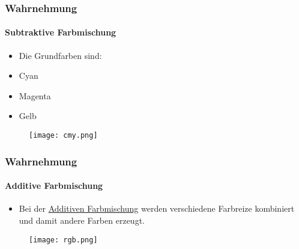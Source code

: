 \begin{frame}
    \frametitle{Wahrnehmung}
    \framesubtitle{Subtraktive Farbmischung}
    \begin{minipage}{0.5\textwidth}
        \begin{itemize}
            \item Die Grundfarben sind:
            \item Cyan
            \item Magenta
            \item Gelb
        \end{itemize}
    \end{minipage} \hfill
    \begin{minipage}{0.45\textwidth}
        \begin{figure}
            \texttt{[image: cmy.png]}
        \end{figure}
    \end{minipage}
\end{frame}

\begin{frame}
    \frametitle{Wahrnehmung}
    \framesubtitle{Additive Farbmischung}
    \begin{minipage}{0.5\textwidth}
        \begin{itemize}
            \item Bei der \href{https://de.wikipedia.org/wiki/Additive_Farbmischung}{Additiven Farbmischung} werden verschiedene Farbreize kombiniert und damit andere Farben erzeugt.
        \end{itemize}
    \end{minipage} \hfill
    \begin{minipage}{0.45\textwidth}
        \begin{figure}
            \texttt{[image: rgb.png]}
        \end{figure}
    \end{minipage}
\end{frame}


